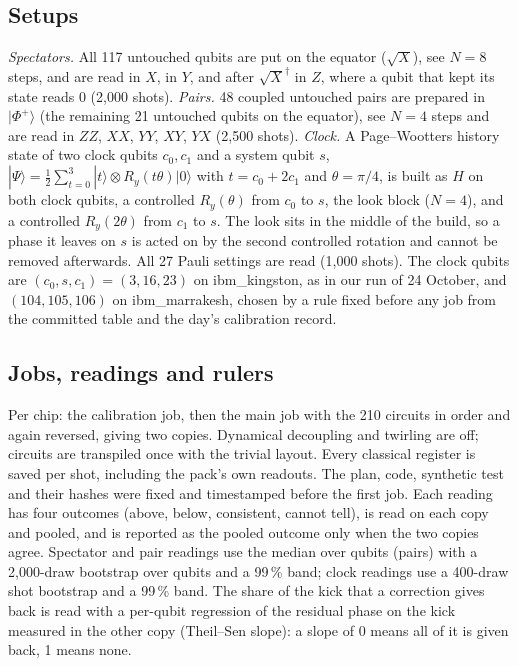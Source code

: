 \subsection{Setups}
\emph{Spectators.} All 117 untouched qubits are put on the equator ($\sqrt{X}$), see $N=8$ steps, and are read in $X$, in $Y$, and after
$\sqrt{X}^\dagger$ in $Z$, where a qubit that kept its state reads 0 (2{,}000 shots). \emph{Pairs.} 48 coupled untouched pairs are prepared in
$|\Phi^+\rangle$ (the remaining 21 untouched qubits on the equator), see $N=4$ steps and are read in $ZZ$, $XX$, $YY$, $XY$, $YX$ (2{,}500 shots).
\emph{Clock.} A Page--Wootters history state of two clock qubits $c_0,c_1$ and a system qubit $s$,
$|\Psi\rangle=\tfrac12\sum_{t=0}^{3}|t\rangle\otimes R_y(t\theta)|0\rangle$ with $t=c_0+2c_1$ and $\theta=\pi/4$, is built as $H$ on both clock
qubits, a controlled $R_y(\theta)$ from $c_0$ to $s$, the look block ($N=4$), and a controlled $R_y(2\theta)$ from $c_1$ to $s$. The look sits in
the middle of the build, so a phase it leaves on $s$ is acted on by the second controlled rotation and cannot be removed afterwards. All 27
Pauli settings are read (1{,}000 shots). The clock qubits are $(c_0,s,c_1)=(3,16,23)$ on ibm\_kingston, as in our run of 24 October, and
$(104,105,106)$ on ibm\_marrakesh, chosen by a rule fixed before any job from the committed table and the day's calibration record.

\subsection{Jobs, readings and rulers}
Per chip: the calibration job, then the main job with the 210 circuits in order and again reversed, giving two copies. Dynamical decoupling and
twirling are off; circuits are transpiled once with the trivial layout. Every classical register is saved per shot, including the pack's own
readouts. The plan, code, synthetic test and their hashes were fixed and timestamped before the first job. Each reading has four outcomes
(above, below, consistent, cannot tell), is read on each copy and pooled, and is reported as the pooled outcome only when the two copies agree.
Spectator and pair readings use the median over qubits (pairs) with a 2{,}000-draw bootstrap over qubits and a 99\,\% band; clock readings use a
400-draw shot bootstrap and a 99\,\% band. The share of the kick that a correction gives back is read with a per-qubit regression of the residual
phase on the kick measured in the other copy (Theil--Sen slope): a slope of 0 means all of it is given back, 1 means none.

